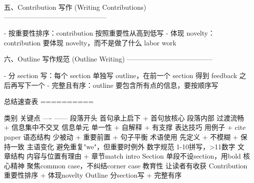 五、Contribution 写作 (Writing Contributions)
---------------------------------------------

- 按重要性排序：contribution 按照重要性从高到低写
- 体现 novelty：contribution 要体现 novelty，而不是做了什么 labor work


六、Outline 写作规范 (Outline Writing)
--------------------------------------

- 分 section 写：每个 section 单独写 outline，在前一个 section 得到 feedback 之后再写下一个
- 完整且有序：outline 要包含所有点的信息，要按顺序写


总结速查表
==========

类别          关键点
----          ------
段落开头      首句承上启下 + 首句放核心
段落内部      过渡流畅 + 信息集中不交叉
信息单元      单一性 + 自解释 + 有支撑
表达技巧      用例子 + cite paper
语态结构      少被动 + 重要前置 + 句子平衡
术语使用      先定义 + 不模糊 + 保持一致
主语变化      避免重复"we"，但重要时例外
数字规范      1-10拼写，>11数字
文章结构      内容与位置有理由 + 章节match intro
Section       单段不设section，用bold
核心精神      聚焦common case，不纠结corner case
教育性        让读者有收获
Contribution  重要性排序 + 体现novelty
Outline       分section写 + 完整有序